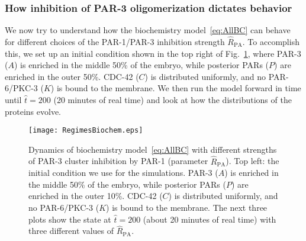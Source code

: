 \documentclass[11pt]{article}
\newcommand{\6}[1]{#1_{\text{6}}}
\newcommand{\3}[1]{#1_{\text{3}}}
\begin{document}
\subsubsection{How inhibition of PAR-3 oligomerization dictates behavior}
We now try to understand how the biochemistry model\ \eqref{eq:AllBC} can behave for different choices of the PAR-1/PAR-3 inhibition strength $\hat R_\text{PA}$. To accomplish this, we set up an initial condition shown in the top right of Fig.\ \ref{fig:BCRegimes}, where PAR-3 ($A$) is enriched in the middle 50\% of the embryo, while posterior PARs ($P$) are enriched in the outer 50\%. CDC-42 ($C$) is distributed uniformly, and no PAR-6/PKC-3 ($K$) is bound to the membrane. We then run the model forward in time until $\hat t = 200$ (20 minutes of real time) and look at how the distributions of the proteins evolve. 

\begin{figure}
\centering
\texttt{[image: RegimesBiochem.eps]}
\caption{\label{fig:BCRegimes}Dynamics of biochemistry model\ \eqref{eq:AllBC} with different strengths of PAR-3 cluster inhibition by PAR-1 (parameter $\hat R_\text{PA}$). Top left: the initial condition we use for the simulations. PAR-3 ($A$) is enriched in the middle 50\% of the embryo, while posterior PARs ($P$) are enriched in the outer 10\%. CDC-42 ($C$) is distributed uniformly, and no PAR-6/PKC-3 ($K$) is bound to the membrane. The next three plots show the state at $\hat t = 200$ (about 20 minutes of real time) with three different values of $\hat R_\text{PA}$. }
\end{figure}
\end{document}
